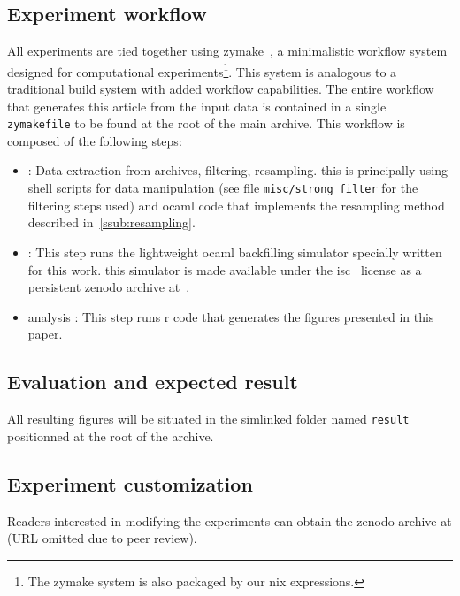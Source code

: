 \documentclass[sigconf,anonymous]{acmart}
\begin{document}
\subsection{Experiment workflow}

 All experiments are tied together using zymake~\cite{zymake}, a minimalistic
 workflow system designed for computational experiments\footnote{The zymake system
 is also packaged by our nix expressions.}. This system is
 analogous to a traditional build system with added workflow capabilities. The
 entire workflow that generates this article from the input data is contained
 in a single \lstinline[basicstyle=\ttfamily\color{blue}]|zymakefile| to be
 found at the root of the main archive. This workflow is composed of the
 following steps:

 \begin{itemize}
   \item[data]: Data extraction from archives, filtering, resampling.
     this is principally using shell scripts for data manipulation (see file
     \lstinline[basicstyle=\ttfamily\color{blue}]|misc/strong_filter| for the
     filtering steps used) and ocaml code that implements the resampling method
     described in~\ref{ssub:resampling}.

   \item[simulation]: This step runs the lightweight ocaml backfilling
     simulator specially written for this work. this simulator is made
     available under the isc~\cite{isc} license as a persistent zenodo
     archive at~\cite{ocst}.

   \item[analysis]: This step runs r code that generates the figures
     presented in this paper.
 \end{itemize}

\subsection{Evaluation and expected result}

All resulting figures will be situated in the simlinked folder named
\lstinline[basicstyle=\ttfamily\color{blue}]|result| positionned at the root of
the archive.

\subsection{Experiment customization}

Readers interested in modifying the experiments can obtain the zenodo archive
at (URL omitted due to peer review).
\end{document}
